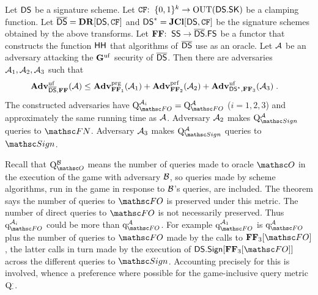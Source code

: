 \begin{theorem}\label{th-dd} Let $\mathsf{DS}$ be a signature scheme. Let $\mathtt{CF}{:\;\;}\{0,1\}^k\to\mathrm{OUT}(\mathsf{DS}.\mathsf{SK})$ be a clamping function. Let $\overline{\mathsf{DS}} = \mathbf{DR}[\mathsf{DS},\mathtt{CF}]$ and $\mathsf{DS}^* = \mathbf{JCl}[\mathsf{DS},\mathtt{CF}]$ be the signature schemes obtained by the above transforms. Let $\mathbf{FF}{:\;\;} \mathsf{SS}\to\overline{\mathsf{DS}}.\mathsf{FS}$ be a functor that constructs the function $\mathsf{HH}$ that algorithms of $\overline{\mathsf{DS}}$ use as an oracle. Let $\mathcal{A}$ be an adversary attacking the $\mathbf{G}^{\mathrm{uf}}$ security of $\overline{\mathsf{DS}}$. Then there are adversaries $\mathcal{A}_1,\mathcal{A}_2,\mathcal{A}_3$ such that
\begin{align*}
	\mathbf{Adv}^{\mathrm{uf}}_{\overline{\mathsf{DS}},\mathbf{FF}}(\mathcal{A}) &\leq   \mathbf{Adv}^{\mathrm{prg}}_{\mathbf{FF}_1}(\mathcal{A}_1) + \mathbf{Adv}^{\mathrm{prf}}_{\mathbf{FF}_2}(\mathcal{A}_2) + \mathbf{Adv}^{\mathrm{uf}}_{\mathsf{DS}^*,\mathbf{FF}_3}(\mathcal{A}_3) \;.
\end{align*}
The constructed adversaries have $\Queries{\HASH}{\advA_i}=\Queries{\HASH}{\advA}$ ($i=1,2,3$) and approximately the same running time as $\mathcal{A}$.  
Adversary $\mathcal{A}_2$ makes $\Queries{\SignOO}{\advA}$ queries to $\FUNCO$.
Adversary $\mathcal{A}_3$ makes $\Queries{\SignOO}{\advA}$ queries to $\SignOO$.
\end{theorem}
Recall that $\Queries{\Oracle}{\advB}$ means the number of queries made to oracle $\Oracle$ in the execution of the game with adversary $\mathcal{B}$, so queries made by scheme algorithms, run in the game in response to $\mathcal{B}$'s queries, are included. The theorem says the number of queries to $\HASH$ is preserved under this metric. The number of direct queries to $\HASH$ is not necessarily preserved. Thus $\QueriesD{\HASH}{\advA_i}$ could be more than $\QueriesD{\HASH}{\advA}$. For example $\QueriesD{\HASH}{\advA_1}$ is $\QueriesD{\HASH}{\advA}$ plus the number of queries to $\HASH$ made by the calls to $\fF_3[\HASH]$, the latter calls in turn made by the execution of $\DS.\Sign[\fF_3[\HASH]]$ across the different queries to $\SignOO$. Accounting precisely for this is involved, whence a preference where possible for the game-inclusive query metric $\mathrm{Q}_{\cdot}^{\cdot}$.



